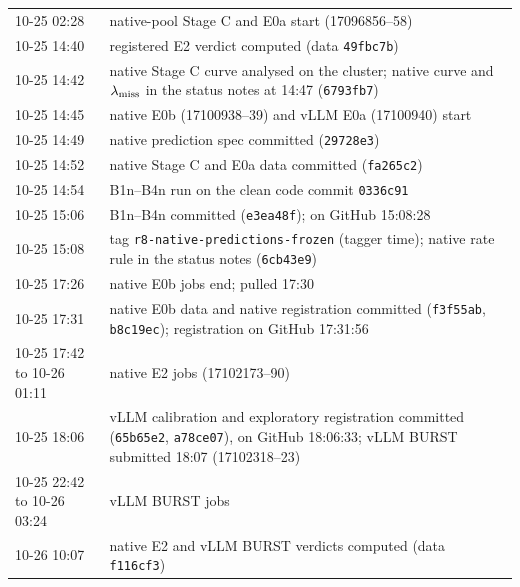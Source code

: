 \begin{table}[p]
\begin{tabular}{@{}p{1.75cm} >{\raggedright\arraybackslash}p{5.6cm}@{}}
10-25 02:28 & native-pool Stage C and E0a start (17096856--58)\\
10-25 14:40 & registered E2 verdict computed (data \texttt{49fbc7b})\\
10-25 14:42 & native Stage C curve analysed on the cluster; native curve and $\lambda_{\mathrm{miss}}$ in the status notes at 14:47 (\texttt{6793fb7})\\
10-25 14:45 & native E0b (17100938--39) and vLLM E0a (17100940) start\\
10-25 14:49 & native prediction spec committed (\texttt{29728e3})\\
10-25 14:52 & native Stage C and E0a data committed (\texttt{fa265c2})\\
10-25 14:54 & B1n--B4n run on the clean code commit \texttt{0336c91}\\
10-25 15:06 & B1n--B4n committed (\texttt{e3ea48f}); on GitHub 15:08:28\\
10-25 15:08 & tag \texttt{r8-native-predictions-frozen} (tagger time); native rate rule in the status notes (\texttt{6cb43e9})\\
10-25 17:26 & native E0b jobs end; pulled 17:30\\
10-25 17:31 & native E0b data and native registration committed (\texttt{f3f55ab}, \texttt{b8c19ec}); registration on GitHub 17:31:56\\
10-25 17:42 to 10-26 01:11 & native E2 jobs (17102173--90)\\
10-25 18:06 & vLLM calibration and exploratory registration committed (\texttt{65b65e2}, \texttt{a78ce07}), on GitHub 18:06:33; vLLM BURST submitted 18:07 (17102318--23)\\
10-25 22:42 to 10-26 03:24 & vLLM BURST jobs\\
10-26 10:07 & native E2 and vLLM BURST verdicts computed (data \texttt{f116cf3})\\
\bottomrule
\end{tabular}
\end{table}


